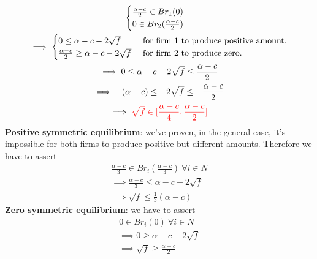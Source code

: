 \documentclass[11pt]{article}
\newcommand{\red}[1]{\textcolor{red}{#1}}
\begin{document}
\begin{example}
\begin{gather}
			\begin{cases}
				\frac{\alpha - c}{2} \in Br_1(0) \\
				0 \in Br_2(\frac{\alpha - c}{2})
			\end{cases} \\
			\implies
			\begin{cases}
				0 \leq \alpha - c - 2\sqrt{f} &\tx{ for firm 1 to produce positive amount.}\\
				\frac{\alpha - c}{2} \geq \alpha - c - 2\sqrt{f} &\tx{ for firm 2 to produce zero.}
			\end{cases} \\
			\implies 0 \leq \alpha - c - 2\sqrt{f} \leq \frac{\alpha - c}{2} \\
			\implies -(\alpha - c) \leq - 2\sqrt{f} \leq -\frac{\alpha - c}{2} \\
			\implies \red{\sqrt{f} \in [\frac{\alpha-c}{4}, \frac{\alpha - c}{2}]}
		\end{gather}
		\textbf{Positive symmetric equilibrium}: we've proven, in the general case, it's impossible for both firms to produce positive but different amounts. Therefore we have to assert 
		\begin{gather}
			\frac{\alpha - c}{3} \in Br_i(\frac{\alpha - c}{3})\ \forall i \in N \\
			\implies \frac{\alpha - c}{3} \leq \alpha - c - 2\sqrt{f} \\
			\implies \sqrt{f} \leq \frac{1}{3} (\alpha - c)
		\end{gather}
		\textbf{Zero symmetric equilibrium}: we have to assert
		\begin{gather}
			0 \in Br_i(0)\ \forall i \in N\\
			\implies 0 \geq \alpha - c - 2\sqrt{f} \\
			\implies \sqrt{f} \geq \frac{\alpha - c}{2}
		\end{gather}
	\end{example}
	
\end{document}
